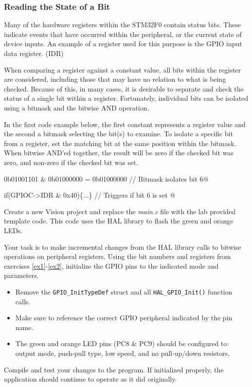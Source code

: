\documentclass[11pt,fleqn]{book} %
\makeatletter
\newcommand{\ilcode}[1]{
    \smallskip
    \colorbox{gray!20!white}{
        \centering
        \parbox{\linewidth-2\fboxsep}{
            \lstinline@#1@
        }
    }
}
\makeatother
\begin{document}
\subsubsection{Reading the State of a Bit}

Many of the hardware registers within the STM32F0 contain status bits. These indicate events that have occurred within the peripheral, or the current state of device inputs. An example of a register used for this purpose is the GPIO input data register. (IDR)

When comparing a register against a constant value, all bits within the register are considered, including those that may have no relation to what is being checked. Because of this, in many cases, it is desirable to separate and check the status of a single bit within a register. Fortunately, individual bits can be isolated using a bitmask and the bitwise AND operation. 

\begin{example} 
In the first code example below, the first constant represents a register value and the second a bitmask selecting the bit(s) to examine. To isolate a specific bit from a register, set the matching bit at the same position within the bitmask. When bitwise AND'ed together, the result will be zero if the checked bit was zero, and non-zero if the checked bit was set. 

\ilcode{0b01001101 \& 0b01000000 = 0b01000000  // Bitmask isolates bit 6}

\ilcode{if(GPIOC->IDR \& 0x40)\{...\} // Triggers if bit 6 is set }
\smallskip
\end{example}

\newpage
\begin{exercise}
    \label{ex3}
    Create a new {\textmu}Vision project and replace the \textit{main.c} file with the lab provided template code. This code uses the HAL library to flash the green and orange LEDs. 
    
    Your task is to make incremental changes from the HAL library calls to bitwise operations on peripheral registers. Using the bit numbers and registers from exercises \ref{ex1}-\ref{ex2}, initialize the GPIO pins to the indicated mode and parameters. 
    \begin{itemize}
        \item Remove the \texttt{GPIO\_InitTypeDef} struct and all \texttt{HAL\_GPIO\_Init()} function calls.
        \item Make sure to reference the correct GPIO peripheral indicated by the pin name. 
        \item The green and orange LED pins (PC8 \& PC9) should be configured to: output mode, push-pull type, low speed, and no pull-up/down resistors.
    \end{itemize}

    \noindent Compile and test your changes to the program. If initialized properly, the application should continue to operate as it did originally. 
\end{exercise}
\end{document}
